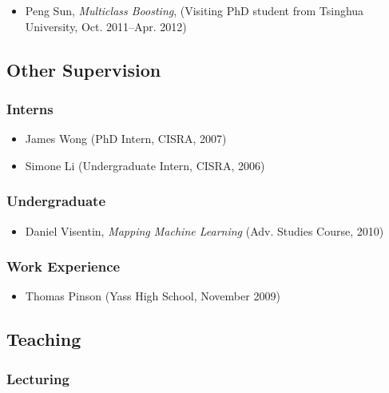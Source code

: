 \documentclass{article}
\begin{document}
\begin{itemize}%
\item Peng Sun, \emph{Multiclass Boosting}, (Visiting PhD student from Tsinghua University, Oct. 2011--{}Apr. 2012)

\end{itemize}
\hypertarget{other_supervision}{}\subsection*{{Other Supervision}}\label{other_supervision}

\hypertarget{interns}{}\subsubsection*{{Interns}}\label{interns}

\begin{itemize}%
\item James Wong (PhD Intern, CISRA, 2007)
\item Simone Li (Undergraduate Intern, CISRA, 2006)

\end{itemize}
\hypertarget{undergraduate}{}\subsubsection*{{Undergraduate}}\label{undergraduate}

\begin{itemize}%
\item Daniel Visentin, \emph{Mapping Machine Learning} (Adv. Studies Course, 2010)

\end{itemize}
\hypertarget{work_experience}{}\subsubsection*{{Work Experience}}\label{work_experience}

\begin{itemize}%
\item Thomas Pinson (Yass High School, November 2009)

\end{itemize}
\hypertarget{teaching}{}\subsection*{{Teaching}}\label{teaching}

\hypertarget{lecturing}{}\subsubsection*{{Lecturing}}\label{lecturing}
\end{document}
